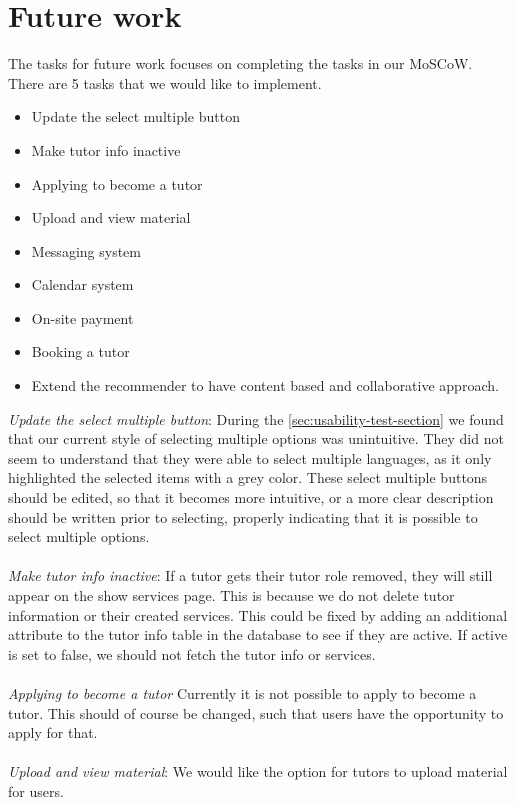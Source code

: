 \section{Future work}
The tasks for future work focuses on completing the tasks in our MoSCoW.
There are 5 tasks that we would like to implement.

\begin{itemize}
    \item Update the select multiple button
    \item Make tutor info inactive
    \item Applying to become a tutor
    \item Upload and view material
    \item Messaging system
    \item Calendar system
    \item On-site payment
    \item Booking a tutor
    \item Extend the recommender to have content based and collaborative approach.
\end{itemize}
\noindent
\textit{Update the select multiple button}:
During the \autoref{sec:usability-test-section} we found that our current style of selecting multiple options was unintuitive. 
They did not seem to understand that they were able to select multiple languages, as it only highlighted the selected items with a grey color.
These select multiple buttons should be edited, so that it becomes more intuitive, or a more clear description should be written prior to selecting, properly indicating that it is possible to select multiple options.
\\\\
\textit{Make tutor info inactive}:
If a tutor gets their tutor role removed, they will still appear on the show services page. 
This is because we do not delete tutor information or their created services.
This could be fixed by adding an additional attribute to the tutor info table in the database to see if they are active.
If active is set to false, we should not fetch the tutor info or services.
\\\\
\textit{Applying to become a tutor}
Currently it is not possible to apply to become a tutor.
This should of course be changed, such that users have the opportunity to apply for that. 
\\\\
\textit{Upload and view material}:
We would like the option for tutors to upload material for users. 
